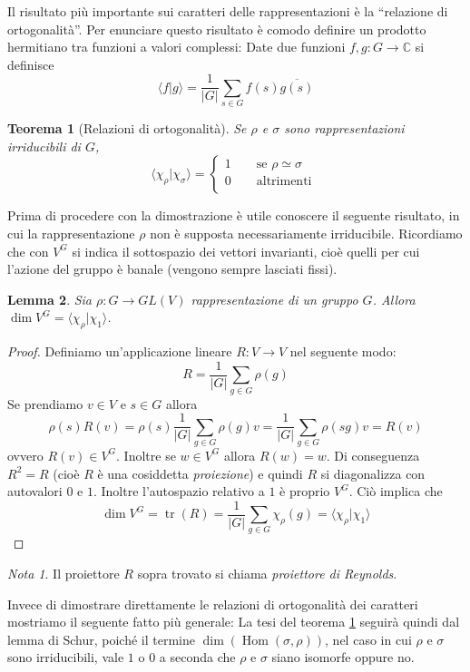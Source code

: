 \documentclass[11pt]{article}
\theoremstyle{plain}
\newtheorem{thm}{Teorema}[section]
\newtheorem{lemma}[thm]{Lemma}
\theoremstyle{definition}
\theoremstyle{remark}
\newtheorem*{note}{Nota}
\newcommand{\C}{\mathbb{C}}
\newcommand{\dsum}{\displaystyle\sum}
\DeclareMathOperator{\tr}{tr}
\DeclareMathOperator{\Hom}{Hom}
\DeclareMathOperator{\iso}{\simeq}
\begin{document}
Il risultato più importante sui caratteri delle rappresentazioni è la ``relazione di ortogonalità''.
Per enunciare questo risultato è comodo definire un prodotto hermitiano tra funzioni a valori complessi:
Date due funzioni $f,g:G\to\C$ si definisce
\[ \langle f | g \rangle = \dfrac{1}{|G|} \dsum_{s \in G} f(s)\overline{ g(s)} \]
\begin{thm}[Relazioni di ortogonalità]
Se $\rho$ e $\sigma$ sono rappresentazioni irriducibili di $G$,
\[\langle \chi_{\rho}|\chi_{\sigma} \rangle = \begin{cases}
1 \qquad \text{se } \rho \iso \sigma \\
0 \qquad \text{altrimenti }\\
\end{cases} \]
\label{relazione di ortogonalita}
\end{thm}
Prima di procedere con la dimostrazione è utile conoscere il seguente risultato,
in cui la rappresentazione $\rho$ non è supposta necessariamente irriducibile.
Ricordiamo che con $V^G$ si indica il sottospazio dei vettori invarianti, cioè quelli
per cui l'azione del gruppo è banale (vengono sempre lasciati fissi).
\begin{lemma}
\label{lemma:reynolds}
Sia $\rho:G\to GL(V)$ rappresentazione di un gruppo $G$. Allora $\dim V^G = \langle\chi_\rho|\chi_1\rangle$.
\label{lemma:dim_invariante}
\end{lemma}
\begin{proof}
Definiamo un'applicazione lineare $R:V\to V$ nel seguente modo:
\[ R = \frac{1}{|G|} \sum_{g\in G}{\rho(g)} \]
Se prendiamo $v\in V$ e $s\in G$ allora
\[ \rho(s) R(v) = \rho(s)\frac{1}{|G|} \sum_{g\in G}{\rho(g)v} = \frac{1}{|G|} \sum_{g\in G}{\rho(sg)v} = R(v)\]
ovvero $R(v)\in V^G$.
Inoltre se $w\in V^G$ allora $R(w)=w$. Di conseguenza $R^2 = R$ (cioè $R$ è una cosiddetta \emph{proiezione})
e quindi $R$ si diagonalizza con autovalori $0$ e $1$. Inoltre l'autospazio relativo a $1$ è proprio $V^G$.
Ciò implica che
\[ \dim V^G = \tr(R) = \frac{1}{|G|} \sum_{g\in G}{\chi_\rho(g)} = \langle\chi_\rho|\chi_1\rangle \]
\end{proof}

\begin{note}
Il proiettore $R$ sopra trovato si chiama \emph{proiettore di Reynolds}.
\end{note}

Invece di dimostrare direttamente le relazioni di ortogonalità dei caratteri mostriamo il seguente fatto più generale:
La tesi del teorema \ref{relazione di ortogonalita} seguirà quindi dal lemma di Schur, poiché il termine $\dim(\Hom (\sigma, \rho))$, nel caso in cui $\rho$ e $\sigma$ sono irriducibili, vale
$1$ o $0$ a seconda che $\rho$ e $\sigma$ siano isomorfe oppure no.
\end{document}
